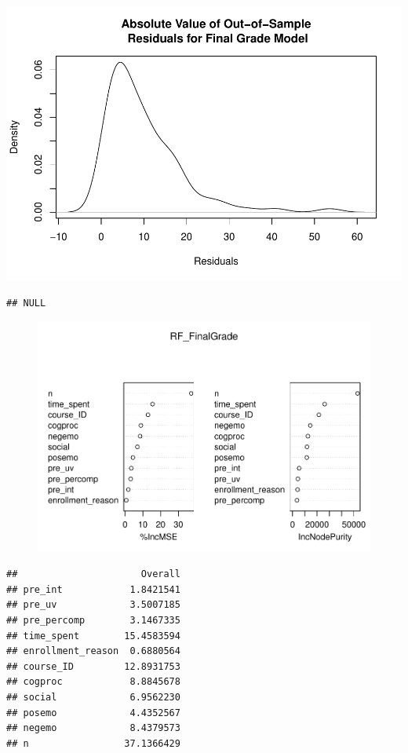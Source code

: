 \documentclass[]{apa6}
\theoremstyle{definition}
\theoremstyle{definition}
\theoremstyle{definition}
\theoremstyle{remark}
\begin{document}
\includegraphics{LAK_Manuscript_files/figure-latex/unnamed-chunk-1-4.pdf}

\begin{verbatim}
## NULL
\end{verbatim}

\begin{figure}
\centering
\includegraphics{LAK_Manuscript_files/figure-latex/unnamed-chunk-1-5.pdf}
\caption{}
\end{figure}

\begin{verbatim}
##                      Overall
## pre_int            1.8421541
## pre_uv             3.5007185
## pre_percomp        3.1467335
## time_spent        15.4583594
## enrollment_reason  0.6880564
## course_ID         12.8931753
## cogproc            8.8845678
## social             6.9562230
## posemo             4.4352567
## negemo             8.4379573
## n                 37.1366429
\end{verbatim}
\end{document}
